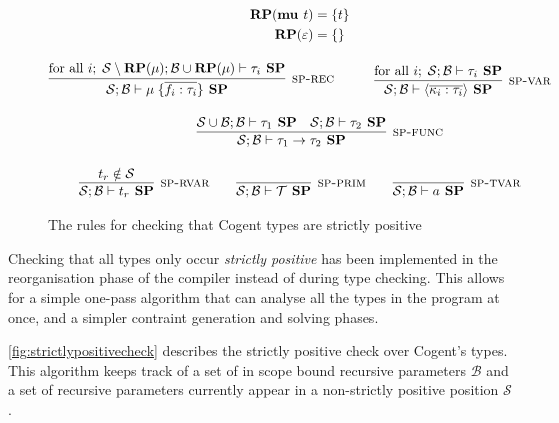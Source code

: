 \begin{figure}
    \centering
    \begin{gather*}
        \begin{split}
            \textbf{RP}(\textbf{mu } t) &= \{t\} \\
            \textbf{RP}(\varepsilon) &= \{\}
        \end{split} \\[10pt]
        \infer[\textsc{sp-rec}]{
            \mathcal{S}; \mathcal{B} \vdash \mu\; \{\overline { f_i : \tau_i } \} \textbf{ SP}
        }{
            \text{for all } i;\; \mathcal{S}\setminus \textbf{RP}(\mu); \mathcal{B} \cup \textbf{RP}(\mu) \vdash \tau_i \textbf{ SP}
        }
        \hspace{3em}
        \infer[\textsc{sp-var}]{
            \mathcal{S}; \mathcal{B} \vdash \langle\overline{\kappa_i : \tau_i}\rangle \textbf{ SP}
        }{
            \text{for all } i;\; \mathcal{S}; \mathcal{B} \vdash \tau_i \textbf{ SP}
        } \\[10pt]
        \hspace{3em}
        \infer[\textsc{sp-func}]{
            \mathcal{S}; \mathcal{B} \vdash \tau_1 \rightarrow \tau_2 \textbf{ SP}
        }{
            \mathcal{S} \cup \mathcal{B}; \mathcal{B} \vdash \tau_1 \textbf{ SP}
            &
            \mathcal{S}; \mathcal{B} \vdash \tau_2 \textbf{ SP}
        } \\[10pt]
        \infer[\textsc{sp-rvar}]{
            \mathcal{S}; \mathcal{B} \vdash t_r \textbf{ SP}
        }{
            t_r \notin \mathcal{S}
        }
        \hspace{2em}
        \infer[\textsc{sp-prim}]{
            \mathcal{S}; \mathcal{B} \vdash \mathcal{T} \textbf{ SP}
        }{}
        \hspace{2em}
        \infer[\textsc{sp-tvar}]{
            \mathcal{S}; \mathcal{B} \vdash a \textbf{ SP}
        }{}
    \end{gather*}
    \caption{The rules for checking that Cogent types are strictly positive}
    \label{fig:strictlypositivecheck}
\end{figure}

Checking that all types only occur \emph{strictly positive} has been implemented in the reorganisation phase of the compiler
instead of during type checking. This allows for a simple one-pass algorithm that can 
analyse all the types in the program at once, and a simpler contraint generation and solving phases.

\autoref{fig:strictlypositivecheck} describes the strictly positive check over Cogent's types.
This algorithm keeps track of a set of in scope bound recursive parameters $\mathcal{B}$ and a set of recursive
parameters currently appear in a non-strictly positive position $\mathcal{S}$.

